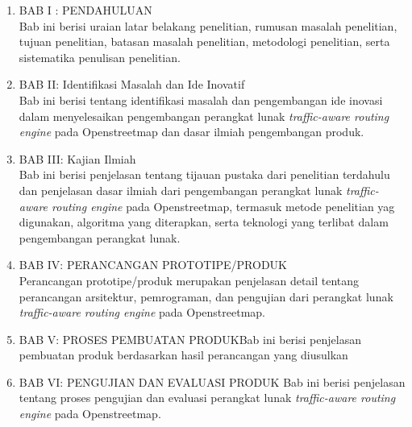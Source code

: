 \begin{enumerate}
    \item BAB I : PENDAHULUAN \\
    Bab ini berisi uraian latar belakang penelitian, rumusan masalah penelitian, tujuan penelitian, batasan masalah penelitian, metodologi penelitian, serta sistematika penulisan penelitian.
    \item BAB II: Identifikasi Masalah dan Ide Inovatif \\
    Bab ini berisi tentang identifikasi masalah dan pengembangan ide inovasi dalam menyelesaikan pengembangan perangkat lunak \textit{traffic-aware routing engine} pada Openstreetmap dan dasar ilmiah pengembangan produk.
    \item BAB III: Kajian Ilmiah \\ 
    Bab ini berisi penjelasan tentang tijauan pustaka dari penelitian terdahulu dan penjelasan dasar ilmiah dari pengembangan perangkat lunak \textit{traffic-aware routing engine} pada Openstreetmap, termasuk metode penelitian yag digunakan, algoritma yang diterapkan, serta teknologi yang terlibat dalam pengembangan perangkat lunak.
    \item BAB IV: PERANCANGAN PROTOTIPE/PRODUK \\
    Perancangan prototipe/produk merupakan penjelasan detail tentang perancangan arsitektur, pemrograman, dan pengujian dari perangkat lunak \textit{traffic-aware routing engine} pada Openstreetmap.
    \item BAB V: PROSES PEMBUATAN PRODUKBab ini berisi penjelasan pembuatan produk berdasarkan hasil perancangan yang diusulkan
    \item BAB VI: PENGUJIAN DAN EVALUASI PRODUK
    Bab ini berisi penjelasan tentang proses pengujian dan evaluasi perangkat lunak \textit{traffic-aware routing engine} pada Openstreetmap. 
    
\end{enumerate}
